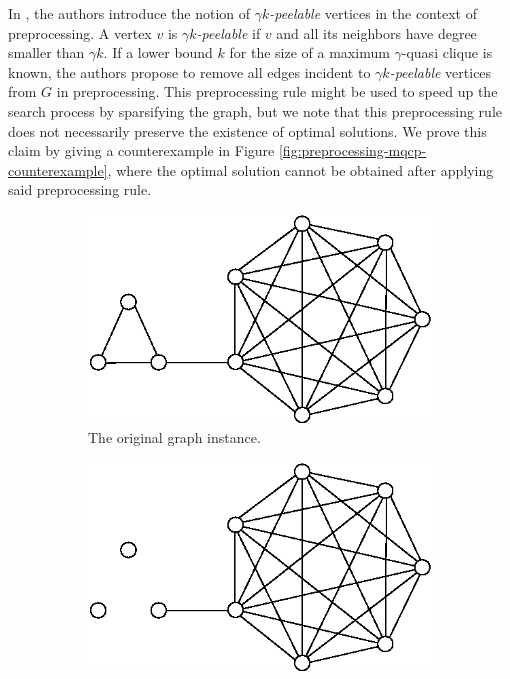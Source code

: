 \documentclass[draft,final]{vutinfth} %
\begin{document}
In \cite{Abello2002}, the authors introduce the notion of $\gamma k$\emph{-peelable} vertices in the context of preprocessing. A vertex $v$ is $\gamma k$\emph{-peelable} if $v$ and all its neighbors have degree smaller than $\gamma k$. If a lower bound $k$ for the size of a maximum $\gamma$-quasi clique is known, the authors propose to remove all edges incident to $\gamma k$\emph{-peelable} vertices from $G$ in preprocessing. This preprocessing rule might be used to speed up the search process by sparsifying the graph, but we note that this preprocessing rule does not necessarily preserve the existence of optimal solutions. We prove this claim by giving a counterexample in Figure \ref{fig:preprocessing-mqcp-counterexample}, where the optimal solution cannot be obtained after applying said preprocessing rule. 


\begin{figure}
    \centering
    \begin{subfigure}{.5\textwidth}
      \centering
      \includegraphics[width=.9\linewidth]{graphics/preprocessing-mqcp-counterexample-1.eps}
      \caption{The original graph instance.}
      \label{fig:preprocessing-mqcp-sub1}
    \end{subfigure}%
    \begin{subfigure}{.5\textwidth}
      \centering
      \includegraphics[width=.9\linewidth]{graphics/preprocessing-mqcp-counterexample-2.eps}

\end{subfigure}
\end{figure}
\end{document}
